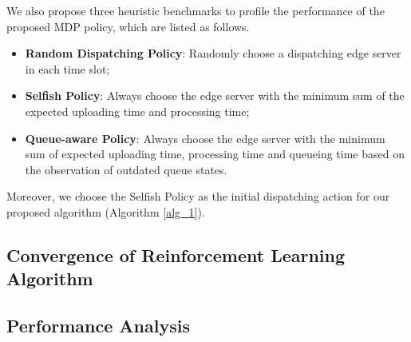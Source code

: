 We also propose {three heuristic benchmarks to profile the performance of the proposed MDP policy}, which are listed as follows.
\begin{itemize}
    \item \textbf{Random Dispatching Policy}:
            Randomly choose a dispatching edge server in each time slot; 
    \item \textbf{Selfish Policy}:
            Always choose the edge server with the minimum sum of the expected uploading time and processing time;
    \item \textbf{Queue-aware Policy}:
            Always choose the edge server with the minimum sum of expected uploading time, processing time and queueing time based on the observation of outdated queue states.
\end{itemize}
Moreover, we choose the Selfish Policy as the initial dispatching action for our proposed algorithm (Algorithm \ref{alg_1}).

\subsection{Convergence of Reinforcement Learning Algorithm}
\label{subsec:basic}

\subsection{Performance Analysis}
\label{subsec:basic}


